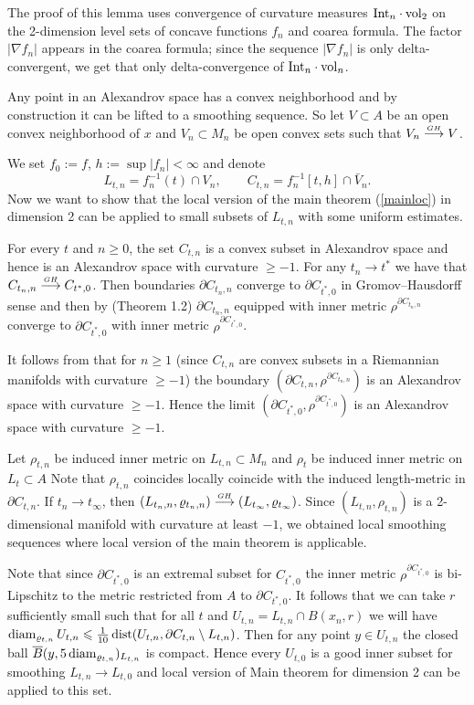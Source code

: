 The proof of this lemma uses 
convergence of curvature measures
$\Int_n\cdot \vol_2$
on  the 2-dimension level sets of concave functions $f_n$ and coarea formula.
The factor $|\nabla f_n|$ appears in the coarea formula;
since the sequence $|\nabla f_n|$ is only delta-convergent, we get that only delta-convergence of $\Int_n\cdot \vol_n$.

Any point  in an Alexandrov space
has a convex neighborhood \cite{petrunin-conc} and by
construction  it can be lifted  to a smoothing sequence.
So let 
$V\subset A$ be an open  convex
neighborhood of $x$ and
$ V_n\subset M_n$
be open convex sets such that
$V_n  \stackrel{\hbox{\tiny $GH$}}{\longrightarrow}   V$.

We set $f_0:=f$, $h:=\sup |f_n|<\infty$
and denote 
$$L_{t,n}=f_n^{-1}(t)\cap V_n,\qquad
C_{t,n}=f_n^{-1}[t,h]\cap \bar V_n.$$
Now we want to show that the local version of the main theorem (\ref{mainloc}) in dimension 2 can be applied to small subsets of $L_{t,n}$ with some uniform estimates.

For every $t$ and $n\ge 0$, the set $C_{t,n}$ is a convex subset in Alexandrov space 
 and hence is an Alexandrov space 
 with curvature $\ge -1$.
For any $t_n\to t^*$ we have that
$C_{t_n,n}     \stackrel{\hbox{\tiny $GH$}}{\longrightarrow}    C_{t^*,0} $. 
Then boundaries  $\partial C_{t_n,n}  $
  converge to $\partial C_{t^*,0}  $ in
Gromov--Hausdorff sense and then by  
  \cite{petrunin-QG} (Theorem 1.2)
 $\partial C_{t_n, n}  $ equipped with inner metric
 $\rho^{\partial C_{t_n,n}}$ converge to
 $\partial C_{t^*,0}  $ with inner metric
 $\rho^{\partial C_{t^*,0}}$.
 
 
 It follows from \cite{AKP} that
 for $n\ge 1$
  (since $C_{t,n}$ are
 convex subsets in a Riemannian manifolds with curvature $\ge -1$)
  the boundary
$(\partial C_{t,n}, \rho^{\partial C_{t_n,n}}) $ is
an Alexandrov space 
 with curvature $\ge -1$. Hence the limit
$(\partial C_{t^*,0}, \rho^{\partial C_{t^*,0}}) $ is
an Alexandrov space 
 with curvature $\ge -1$.

Let $\rho_{t,n}$ be induced inner metric on $L_{t,n}\subset M_n$ and $\rho_{t}$ be induced inner metric on $L_{t}\subset A$
Note that $\rho_{t,n}$ coincides locally coincide with the induced length-metric in 
$\partial C_{t,n}$.
If $t_n\to t_\infty$, then 
$(L_{t_n,n}, \varrho_{t_n,n})\stackrel{\hbox{\tiny $GH$}}{\longrightarrow} (L_{t_\infty},\varrho_{t_\infty})$.
Since $(L_{t,n}, \rho_{t,n})$ is a 2-dimensional manifold with curvature at least $-1$,
we obtained local smoothing sequences where local version of the main theorem is applicable.

Note that since 
$\partial C_{t^*,0}$
is an extremal subset for
$C_{t^*,0}$
 the inner metric
$ \rho^{\partial C_{t^*,0}} $ is bi-Lipschitz to
the metric restricted from $A$ to
$\partial C_{t^*,0}$.
It follows that
we can take $r$ sufficiently small
such that for all $t$ and
$U_{t,n}=L_{t,n}\cap B(x_n,r)$
we will have
$\operatorname{diam}_{\varrho_{t,n}} U_{t,n}\leqslant \tfrac 1{10} \operatorname{\rm dist}   (U_{t,n},\partial C_{t,n}\setminus L_{t,n})$.
Then for any point $y\in U_{t,n}$ the closed ball
$\overline{B}(y,5\operatorname{diam}_{\varrho_{t,n}})_{L_{t,n}}$ is compact.
Hence every $U_{t,0}$ is a good inner subset for 
smoothing  $L_{t,n}\to L_{t,0}$
and local version of Main theorem for dimension 2
can be applied to this set.

